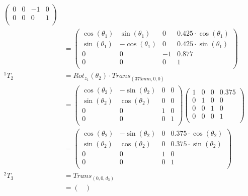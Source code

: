 \documentclass[a4paper,11pt]{article}
\begin{document}
\begin {enumerate}
\begin{enumerate}
\begin{align*}
\begin{pmatrix}
                0 & 0 & -1 & 0\\
                0 & 0 & 0 & 1\\
            \end{pmatrix}\\
            &= \begin{pmatrix}
                \cos(\theta_1) & \sin(\theta_1) & 0 & 0.425 \cdot \cos(\theta_1)\\
                \sin(\theta_1) & -\cos(\theta_1) & 0 & 0.425 \cdot \sin(\theta_1)\\
                0 & 0 & -1 & 0.877\\
                0 & 0 & 0 & 1\\
            \end{pmatrix}\\
            {^1T_2} &= Rot_{z_1}(\theta_2) \cdot Trans_{(375mm,0,0)}\\
            &= \begin{pmatrix}
                \cos(\theta_2) & -\sin(\theta_2) & 0 & 0\\
                \sin(\theta_2) & \cos(\theta_2) & 0 & 0\\
                0 & 0 & 1 & 0\\
                0 & 0 & 0 & 1\\
            \end{pmatrix}
            \begin{pmatrix}
                1 & 0 & 0 & 0.375\\
                0 & 1 & 0 & 0\\
                0 & 0 & 1 & 0\\
                0 & 0 & 0 & 1\\
            \end{pmatrix}\\
            &= \begin{pmatrix}
                \cos(\theta_2) & -\sin(\theta_2) & 0 & 0.375 \cdot \cos(\theta_2)\\
                \sin(\theta_2) & \cos(\theta_2) & 0 & 0.375 \cdot \sin(\theta_2)\\
                0 & 0 & 1 & 0\\
                0 & 0 & 0 & 1\\
            \end{pmatrix}\\
            {^2T_3} &= Trans_{(0,0,d_3)}\\
            &= \begin{pmatrix}

\end{pmatrix}
\end{align*}
\end{enumerate}
\end{enumerate}
\end{document}
